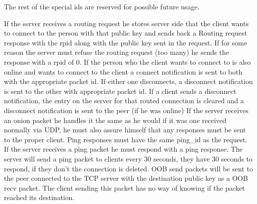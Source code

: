 \documentclass{tox}
\begin{document}
The rest of the special ids are reserved for possible future usage.

If the server receives a routing request he stores server side that the client wants to connect to the person with that public key and sends back a Routing request response with the rpid along with the public key sent in the request.
If for some reason the server must refuse the routing request (too many) he sends the response with a rpid of 0.
If the person who the client wants to connect to is also online and wants to connect to the client a connect notification is sent to both with the appropriate packet id.
If either one disconnects, a disconnect notification is sent to the other with appropriate packet id.
If a client sends a disconnect notification, the entry on the server for that routed connection is cleared and a disconnect notification is sent to the peer (if he was online)
If the server receives an onion packet he handles it the same as he would if it was one received normally via UDP, he must also assure himself that any responses must be sent to the proper client.
Ping responses must have the same ping\_id as the request.
If the server receives a ping packet he must respond with a ping response.
The server will send a ping packet to clients every 30 seconds, they have 30 seconds to respond, if they don't the connection is deleted.
OOB send packets will be sent to the peer connected to the TCP server with the destination public key as a OOB recv packet. The client sending this packet has no way of knowing if the packet reached its destination.
\end{document}
